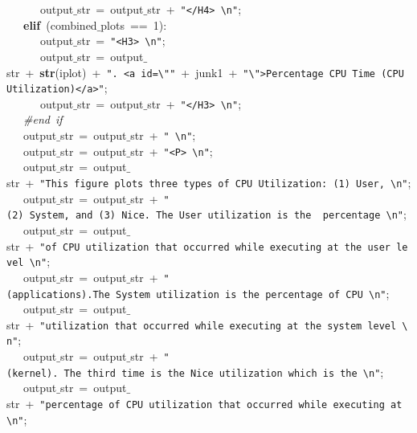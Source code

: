\mbox{}\ \ \ \ \ \ output$\_$str\ =\ output$\_$str\ +\ \texttt{"{}\textless{}/H4\textgreater{}\ \textbackslash{}n"{}}; \\
\mbox{}\ \ \ \textbf{elif}\ (combined$\_$plots\ ==\ 1): \\
\mbox{}\ \ \ \ \ \ output$\_$str\ =\ \texttt{"{}\textless{}H3\textgreater{}\ \textbackslash{}n"{}}; \\
\mbox{}\ \ \ \ \ \ output$\_$str\ =\ output$\_$str\ +\ \textbf{str}(iplot)\ +\ \texttt{"{}.\ \textless{}a\ id=\textbackslash{}"{}"{}}\ +\ junk1\ +\ \texttt{"{}\textbackslash{}"{}\textgreater{}Percentage\ CPU\ Time\ (CPU\ Utilization)\textless{}/a\textgreater{}"{}}; \\
\mbox{}\ \ \ \ \ \ output$\_$str\ =\ output$\_$str\ +\ \texttt{"{}\textless{}/H3\textgreater{}\ \textbackslash{}n"{}}; \\
\mbox{}\ \ \ \textit{\#end\ if} \\
\mbox{}\ \ \ output$\_$str\ =\ output$\_$str\ +\ \texttt{"{}\ \textbackslash{}n"{}}; \\
\mbox{}\ \ \ output$\_$str\ =\ output$\_$str\ +\ \texttt{"{}\textless{}P\textgreater{}\ \textbackslash{}n"{}}; \\
\mbox{}\ \ \ output$\_$str\ =\ output$\_$str\ +\ \texttt{"{}This\ figure\ plots\ three\ types\ of\ CPU\ Utilization:\ (1)\ User,\ \textbackslash{}n"{}}; \\
\mbox{}\ \ \ output$\_$str\ =\ output$\_$str\ +\ \texttt{"{}(2)\ System,\ and\ (3)\ Nice.\ The\ User\ utilization\ is\ the\ \ percentage\ \textbackslash{}n"{}}; \\
\mbox{}\ \ \ output$\_$str\ =\ output$\_$str\ +\ \texttt{"{}of\ CPU\ utilization\ that\ occurred\ while\ executing\ at\ the\ user\ level\ \textbackslash{}n"{}}; \\
\mbox{}\ \ \ output$\_$str\ =\ output$\_$str\ +\ \texttt{"{}(applications).The\ System\ utilization\ is\ the\ percentage\ of\ CPU\ \textbackslash{}n"{}}; \\
\mbox{}\ \ \ output$\_$str\ =\ output$\_$str\ +\ \texttt{"{}utilization\ that\ occurred\ while\ executing\ at\ the\ system\ level\ \textbackslash{}n"{}}; \\
\mbox{}\ \ \ output$\_$str\ =\ output$\_$str\ +\ \texttt{"{}(kernel).\ The\ third\ time\ is\ the\ Nice\ utilization\ which\ is\ the\ \textbackslash{}n"{}}; \\
\mbox{}\ \ \ output$\_$str\ =\ output$\_$str\ +\ \texttt{"{}percentage\ of\ CPU\ utilization\ that\ occurred\ while\ executing\ at\ \textbackslash{}n"{}}; \\
